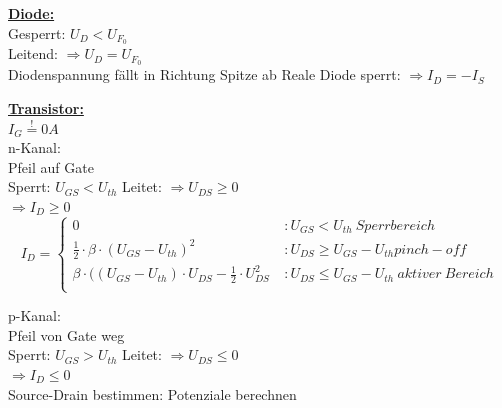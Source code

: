 \documentclass[11pt]{article}
\begin{document}
\newpage
\begin{minipage}{0.3\textwidth}

\underline{\textbf{Diode:}}\\
Gesperrt: $U_D < U_{F_0}$\\
Leitend: $\Rightarrow U_D = U_{F_0}$\\
Diodenspannung fällt in Richtung Spitze ab
Reale Diode sperrt: $\Rightarrow I_D = -I_S$

\underline{\textbf{Transistor:}}\\
$I_G \stackrel{!}{=} 0A$\\
n-Kanal:\\
\phantom{ss} Pfeil auf Gate\\
\phantom{ss} Sperrt: $U_{GS} < U_{th}$
\phantom{ss} Leitet: $\Rightarrow U_{DS} \geq 0$\\
\phantom{sssssisisssi}$\Rightarrow I_D \geq 0$\\

\[I_D = \left\{
  \begin{array}{lr}
    0 & : U_{GS} < U_{th}~Sperrbereich\\
    \frac{1}{2} \cdot \beta \cdot(U_{GS} - U_{th})^2  \ & : U_{DS} \ge U_{GS} - U_{th} pinch-off\\
       \beta \cdot((U_{GS} - U_{th}) \cdot U_{DS} - \frac{1}{2} \cdot U_{DS}^2  \ & : U_{DS} \leq U_{GS} - U_{th}~aktiver~Bereich\\
  \end{array}
\right.
\]

p-Kanal:\\
\phantom{ss} Pfeil von Gate weg\\
\phantom{ss} Sperrt: $U_{GS} > U_{th}$
\phantom{ss} Leitet: $\Rightarrow U_{DS} \leq 0$\\
\phantom{sssssisisssi}$\Rightarrow I_D \leq 0$\\

Source-Drain bestimmen: Potenziale berechnen\\
\end{minipage}%

\end{document}
